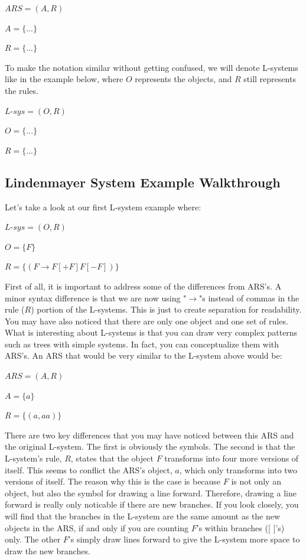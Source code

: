 \documentclass{article}
\begin{document}
\medskip
  $ARS = (A, R)$

\smallskip
  $A = \{...\}$

\smallskip
  $R = \{...\}$

\medskip\noindent
To make the notation similar without getting confused, we will denote L-systems like in the example below, where $O$ represents the objects, and $R$ still represents the rules.

\medskip
  $L$-$sys = (O, R)$

\smallskip
  $O = \{...\}$

\smallskip
  $R = \{...\}$

\subsection{Lindenmayer System Example Walkthrough}

\medskip\noindent
Let's take a look at our first L-system example where:

\medskip
  $L$-$sys = (O, R)$
  
\smallskip
  $O = \{ F \}$
  
\smallskip
  $R = \{ (F \rightarrow F[+F]F[-F]) \}$

\medskip\noindent
First of all, it is important to address some of the differences from ARS's. A minor syntax difference is that we are now using "$\rightarrow$"s instead of commas in the rule ($R$) portion of the L-systems. This is just to create separation for readability. You may have also noticed that there are only one object and one set of rules. What is interesting about L-systems is that you can draw very complex patterns such as trees with simple systems. In fact, you can conceptualize them with ARS's. An ARS that would be very similar to the L-system above would be:

\medskip
  $ARS = (A, R)$
  
\smallskip
  $A = \{a\}$
  
\smallskip
  $R = \{(a, aa)\}$

\medskip\noindent
There are two key differences that you may have noticed between this ARS and the original L-system. The first is obviously the symbols. The second is that the L-system's rule, $R$, states that the object $F$ transforms into four more versions of itself. This seems to conflict the ARS's object, $a$, which only transforms into two versions of itself. The reason why this is the case is because $F$ is not only an object, but also the symbol for drawing a line forward. Therefore, drawing a line forward is really only noticable if there are new branches. If you look closely, you will find that the branches in the L-system are the same amount as the new objects in the ARS, if and only if you are counting $F$'s within branches ($[$ $]$'s) only. The other $F$'s simply draw lines forward to give the L-system more space to draw the new branches.
\end{document}

